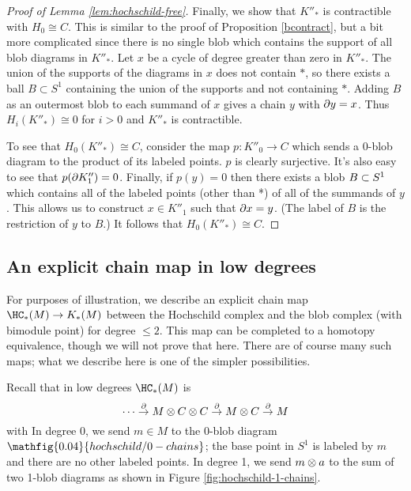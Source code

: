 \begin{proof}[Proof of Lemma \ref{lem:hochschild-free}]
Finally, we show that $K''_*$ is contractible with $H_0\cong C$.
This is similar to the proof of Proposition \ref{bcontract}, but a bit more
complicated since there is no single blob which contains the support of all blob diagrams
in $K''_*$.
Let $x$ be a cycle of degree greater than zero in $K''_*$.
The union of the supports of the diagrams in $x$ does not contain $*$, so there exists a
ball $B \subset S^1$ containing the union of the supports and not containing $*$.
Adding $B$ as an outermost blob to each summand of $x$ gives a chain $y$ with $\partial y = x$.
Thus $H_i(K''_*) \cong 0$ for $i> 0$ and $K''_*$ is contractible.

To see that $H_0(K''_*) \cong C$, consider the map $p: K''_0 \to C$ which sends a 0-blob
diagram to the product of its labeled points.
$p$ is clearly surjective.
It's also easy to see that $p(\partial K''_1) = 0$.
Finally, if $p(y) = 0$ then there exists a blob $B \subset S^1$ which contains
all of the labeled points (other than *) of all of the summands of $y$.
This allows us to construct $x\in K''_1$ such that $\partial x = y$.
(The label of $B$ is the restriction of $y$ to $B$.)
It follows that $H_0(K''_*) \cong C$.
\end{proof}

\subsection{An explicit chain map in low degrees}

For purposes of illustration, we describe an explicit chain map
$\HC_*(M) \to K_*(M)$
between the Hochschild complex and the blob complex (with bimodule point)
for degree $\le 2$.
This map can be completed to a homotopy equivalence, though we will not prove that here.
There are of course many such maps; what we describe here is one of the simpler possibilities.

Recall that in low degrees $\HC_*(M)$ is
\[
	\cdots \stackrel{\partial}{\to} M \otimes C\otimes C \stackrel{\partial}{\to} 
			M \otimes C \stackrel{\partial}{\to} M
\]
with
In degree 0, we send $m\in M$ to the 0-blob diagram $\mathfig{0.04}{hochschild/0-chains}$; the base point
in $S^1$ is labeled by $m$ and there are no other labeled points.
In degree 1, we send $m\otimes a$ to the sum of two 1-blob diagrams
as shown in Figure \ref{fig:hochschild-1-chains}.


